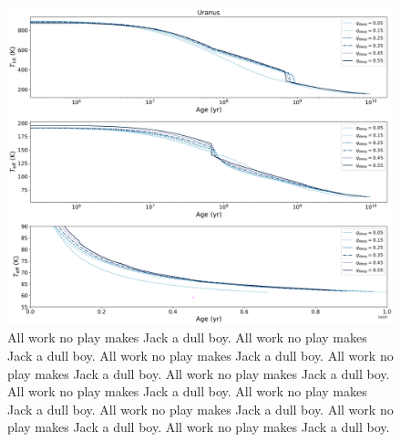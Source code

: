 \documentclass[11pt]{ucscthesisbs}
\begin{document}
\begin{figure}[ht]
 \centerline{
  \includegraphics[scale=0.45]{figures/u_cooling_curves_nz_4096_more_qdeeps.png}
 }
\caption[Inhibition of convection on Uranus]
{All work no play makes Jack a dull boy. All work no play makes Jack a dull boy. All work no play makes Jack a dull boy. All work no play makes Jack a dull boy. All work no play makes Jack a dull boy. All work no play makes Jack a dull boy. All work no play makes Jack a dull boy. All work no play makes Jack a dull boy. All work no play makes Jack a dull boy. All work no play makes Jack a dull boy. }
\label{fig:evolve_uranus_qdeeps}
\end{figure}

 
\end{document}
